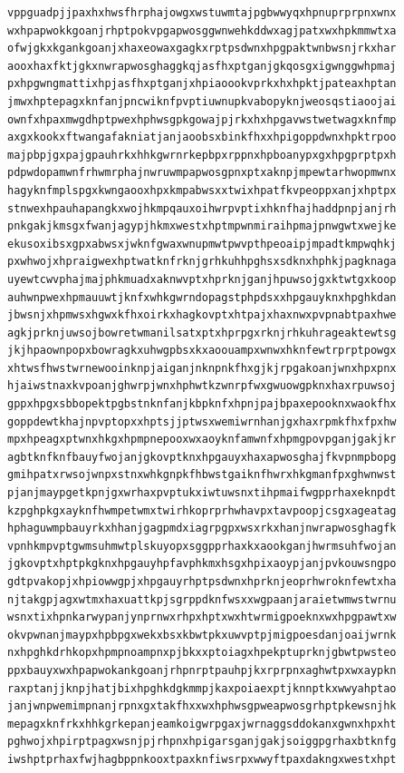 \documentclass[11pt,letterpaper]{exam}
\begin{document}
\begin{questions}
\begin{verbatim}
vppguadpjjpaxhxhwsfhrphajowgxwstuwmtajpgbwwyqxhpnuprprpnxwnx
wxhpapwokkgoanjrhptpokvpgapwosggwnwehkddwxagjpatxwxhpkmmwtxa
ofwjgkxkgankgoanjxhaxeowaxgagkxrptpsdwnxhpgpaktwnbwsnjrkxhar
aooxhaxfktjgkxnwrapwosghaggkqjasfhxptganjgkqosgxigwnggwhpmaj
pxhpgwngmattixhpjasfhxptganjxhpiaoookvprkxhxhpktjpateaxhptan
jmwxhptepagxknfanjpncwiknfpvptiuwnupkvabopyknjweosqstiaoojai
ownfxhpaxmwgdhptpwexhphwsgpkgowajpjrkxhxhpgavwstwetwagxknfmp
axgxkookxftwangafakniatjanjaoobsxbinkfhxxhpigoppdwnxhpktrpoo
majpbpjgxpajgpauhrkxhhkgwrnrkepbpxrppnxhpboanypxgxhpgprptpxh
pdpwdopamwnfrhwmrphajnwruwmpapwosgpnxptxaknpjmpewtarhwopmwnx
hagyknfmplspgxkwngaooxhpxkmpabwsxxtwixhpatfkvpeoppxanjxhptpx
stnwexhpauhapangkxwojhkmpqauxoihwrpvptixhknfhajhaddpnpjanjrh
pnkgakjkmsgxfwanjagypjhkmxwestxhptmpwnmiraihpmajpnwgwtxwejke
ekusoxibsxgpxabwsxjwknfgwaxwnupmwtpwvpthpeoaipjmpadtkmpwqhkj
pxwhwojxhpraigwexhptwatknfrknjgrhkuhhpghsxsdknxhphkjpagknaga
uyewtcwvphajmajphkmuadxaknwvptxhprknjganjhpuwsojgxktwtgxkoop
auhwnpwexhpmauuwtjknfxwhkgwrndopagstphpdsxxhpgauyknxhpghkdan
jbwsnjxhpmwsxhgwxkfhxoirkxhagkovptxhtpajxhaxnwxpvpnabtpaxhwe
agkjprknjuwsojbowretwmanilsatxptxhprpgxrknjrhkuhrageaktewtsg
jkjhpaownpopxbowragkxuhwgpbsxkxaoouampxwnwxhknfewtrprptpowgx
xhtwsfhwstwrnewooinknpjaiganjnknpnkfhxgjkjrpgakoanjwnxhpxpnx
hjaiwstnaxkvpoanjghwrpjwnxhphwtkzwnrpfwxgwuowgpknxhaxrpuwsoj
gppxhpgxsbbopektpgbstnknfanjkbpknfxhpnjpajbpaxepooknxwaokfhx
goppdewtkhajnpvptopxxhptsjjptwsxwemiwrnhanjgxhaxrpmkfhxfpxhw
mpxhpeagxptwnxhkgxhpmpnepooxwxaoyknfamwnfxhpmgpovpganjgakjkr
agbtknfknfbauyfwojanjgkovptknxhpgauyxhaxapwosghajfkvpnmpbopg
gmihpatxrwsojwnpxstnxwhkgnpkfhbwstgaiknfhwrxhkgmanfpxghwnwst
pjanjmaypgetkpnjgxwrhaxpvptukxiwtuwsnxtihpmaifwgpprhaxeknpdt
kzpghpkgxayknfhwmpetwmxtwirhkoprprhwhavpxtavpoopjcsgxageatag
hphaguwmpbauyrkxhhanjgagpmdxiagrpgpxwsxrkxhanjnwrapwosghagfk
vpnhkmpvptgwmsuhmwtplskuyopxsggpprhaxkxaookganjhwrmsuhfwojan
jgkovptxhptpkgknxhpgauyhpfavphkmxhsgxhpixaoypjanjpvkouwsngpo
gdtpvakopjxhpiowwgpjxhpgauyrhptpsdwnxhprknjeoprhwroknfewtxha
njtakgpjagxwtmxhaxuattkpjsgrppdknfwsxxwgpaanjaraietwmwstwrnu
wsnxtixhpnkarwypanjynprnwxrhpxhptxwxhtwrmigpoeknxwxhpgpawtxw
okvpwnanjmaypxhpbpgxwekxbsxkbwtpkxuwvptpjmigpoesdanjoaijwrnk
nxhpghkdrhkopxhpmpnoampnxpjbkxxptoiagxhpekptuprknjgbwtpwsteo
ppxbauyxwxhpapwokankgoanjrhpnrptpauhpjkxrprpnxaghwtpxwxaypkn
raxptanjjknpjhatjbixhpghkdgkmmpjkaxpoiaexptjknnptkxwwyahptao
janjwnpwemimpnanjrpnxgxtakfhxxwxhphwsgpweapwosgrhptpkewsnjhk
mepagxknfrkxhhkgrkepanjeamkoigwrpgaxjwrnaggsddokanxgwnxhpxht
pghwojxhpirptpagxwsnjpjrhpnxhpigarsganjgakjsoiggpgrhaxbtknfg
iwshptprhaxfwjhagbppnkooxtpaxknfiwsrpxwwyftpaxdakngxwestxhpt

\end{verbatim}
\end{questions}
\end{document}
